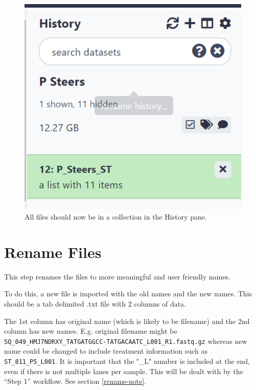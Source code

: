 \documentclass[
]{book}
\begin{document}
\begin{figure}

{\centering \includegraphics[width=6.01in]{images/image008} 

}

\caption{All files should now be in a collection in the History pane.}\label{fig:chunk8}
\end{figure}

\hypertarget{rename-files}{%
\section{Rename Files}\label{rename-files}}

This step renames the files to more meaningful and user friendly names.

To do this, a new file is imported with the old names and the new names. This should be a tab delimited .txt file with 2 columns of data.

The 1st column has original name (which is likely to be filename) and the 2nd column has new names. E.g. original filename might be \texttt{SQ\_049\_HMJ7NDRXY\_TATGATGGCC-TATGACAATC\_L001\_R1.fastq.gz} whereas new name could be changed to include treatment information such as \texttt{ST\_811\_P5\_L001}.
It is important that the "\_L" number is included at the end, even if there is not multiple lanes per sample. This will be dealt with by the ``Step 1'' workflow. See section \ref{rename-note}.
\end{document}
